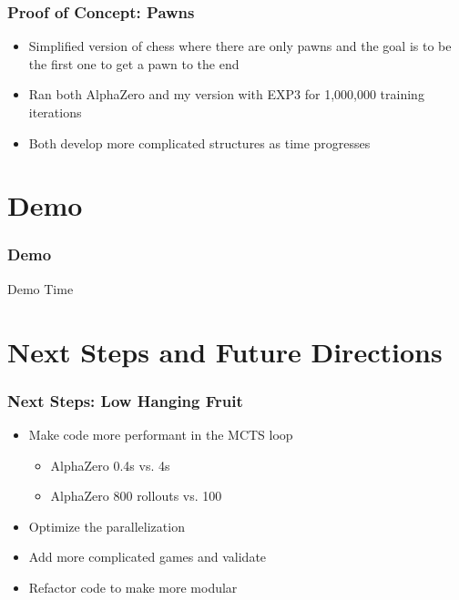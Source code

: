 \documentclass{beamer}
\begin{document}


\begin{frame}
  \frametitle{Proof of Concept: Pawns}

  \begin{itemize}
    \item Simplified version of chess where there are only pawns and the goal is to be the first one to get a pawn to the end
    \item Ran both AlphaZero and my version with EXP3 for 1,000,000 training iterations
    \item Both develop more complicated structures as time progresses
  \end{itemize}
\end{frame}


\section{Demo}


\begin{frame}
\frametitle{Demo}
  \begin{center}
    \Large Demo Time
    \end{center}
\end{frame}


\section{Next Steps and Future Directions}


\begin{frame}
  \frametitle{Next Steps: Low Hanging Fruit}

  \begin{itemize}
    \item Make code more performant in the MCTS loop
      \begin{itemize}
        \item AlphaZero 0.4s vs. 4s
        \item AlphaZero 800 rollouts vs. 100
      \end{itemize}
    \item Optimize the parallelization
    \item Add more complicated games and validate
    \item Refactor code to make more modular
  \end{itemize}
\end{frame}
\end{document}

